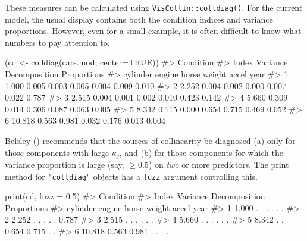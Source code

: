 \documentclass[
  letterpaper,
  10pt,
  krantz2]{krantz}
\makeatletter
\newenvironment{Shaded}{\begin{snugshade}}{\end{snugshade}}
\newcommand{\AttributeTok}[1]{\textcolor[rgb]{0.40,0.45,0.13}{#1}}
\newcommand{\CommentTok}[1]{\textcolor[rgb]{0.37,0.37,0.37}{#1}}
\newcommand{\ConstantTok}[1]{\textcolor[rgb]{0.56,0.35,0.01}{#1}}
\newcommand{\FloatTok}[1]{\textcolor[rgb]{0.68,0.00,0.00}{#1}}
\newcommand{\FunctionTok}[1]{\textcolor[rgb]{0.28,0.35,0.67}{#1}}
\newcommand{\NormalTok}[1]{\textcolor[rgb]{0.00,0.23,0.31}{#1}}
\newcommand{\OtherTok}[1]{\textcolor[rgb]{0.00,0.23,0.31}{#1}}
\newenvironment{kframe}{%
  \medskip{}
  \setlength{\fboxsep}{.8em}
  \def\at@end@of@kframe{}%
  \ifinner\ifhmode%
  \def\at@end@of@kframe{\end{minipage}}%
  \begin{minipage}{\columnwidth}%
  \fi\fi%
  \def\FrameCommand##1{\hskip\@totalleftmargin \hskip-\fboxsep
  \colorbox{shadecolor}{##1}\hskip-\fboxsep
      \hskip-\linewidth \hskip-\@totalleftmargin \hskip\columnwidth}%
  \MakeFramed {\advance\hsize-\width
    \@totalleftmargin\z@ \linewidth\hsize
    \@setminipage}}%
{\par\unskip\endMakeFramed%
  \at@end@of@kframe}
\renewenvironment{Shaded}{\begin{kframe}}{\end{kframe}}
\makeatother
\begin{document}
These measures can be calculated using \texttt{VisCollin::colldiag()}.
For the current model, the usual display contains both the condition
indices and variance proportions. However, even for a small example, it
is often difficult to know what numbers to pay attention to.

\begin{Shaded}
\begin{Highlighting}[]
\NormalTok{(cd }\OtherTok{\textless{}{-}} \FunctionTok{colldiag}\NormalTok{(cars.mod, }\AttributeTok{center=}\ConstantTok{TRUE}\NormalTok{))}
\CommentTok{\#\textgreater{} Condition}
\CommentTok{\#\textgreater{} Index    Variance Decomposition Proportions}
\CommentTok{\#\textgreater{}           cylinder engine horse weight accel year }
\CommentTok{\#\textgreater{} 1   1.000 0.005    0.003  0.005 0.004  0.009 0.010}
\CommentTok{\#\textgreater{} 2   2.252 0.004    0.002  0.000 0.007  0.022 0.787}
\CommentTok{\#\textgreater{} 3   2.515 0.004    0.001  0.002 0.010  0.423 0.142}
\CommentTok{\#\textgreater{} 4   5.660 0.309    0.014  0.306 0.087  0.063 0.005}
\CommentTok{\#\textgreater{} 5   8.342 0.115    0.000  0.654 0.715  0.469 0.052}
\CommentTok{\#\textgreater{} 6  10.818 0.563    0.981  0.032 0.176  0.013 0.004}
\end{Highlighting}
\end{Shaded}

Belsley () recommends that the sources
of collinearity be diagnosed (a) only for those components with large
\(\kappa_j\), and (b) for those components for which the variance
proportion is large (say, \(\ge 0.5\)) on \emph{two} or more predictors.
The print method for \texttt{"colldiag"} objects has a \texttt{fuzz}
argument controlling this.

\begin{Shaded}
\begin{Highlighting}[]
\FunctionTok{print}\NormalTok{(cd, }\AttributeTok{fuzz =} \FloatTok{0.5}\NormalTok{)}
\CommentTok{\#\textgreater{} Condition}
\CommentTok{\#\textgreater{} Index    Variance Decomposition Proportions}
\CommentTok{\#\textgreater{}           cylinder engine horse weight accel year }
\CommentTok{\#\textgreater{} 1   1.000  .        .      .     .      .     .   }
\CommentTok{\#\textgreater{} 2   2.252  .        .      .     .      .    0.787}
\CommentTok{\#\textgreater{} 3   2.515  .        .      .     .      .     .   }
\CommentTok{\#\textgreater{} 4   5.660  .        .      .     .      .     .   }
\CommentTok{\#\textgreater{} 5   8.342  .        .     0.654 0.715   .     .   }
\CommentTok{\#\textgreater{} 6  10.818 0.563    0.981   .     .      .     .}
\end{Highlighting}
\end{Shaded}
\end{document}
